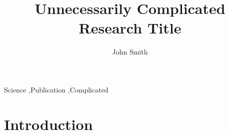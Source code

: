 \documentclass[preprint,12pt]{elsarticle}
\begin{document}
\begin{frontmatter}


\title{Unnecessarily Complicated Research Title}




\author{John Smith}

\address{California, United States}

\begin{abstract}

\end{abstract}

\begin{keyword}
Science \sep Publication \sep Complicated


\end{keyword}

\end{frontmatter}

\linenumbers

\section{Introduction}
\label{S:1}
\end{document}
